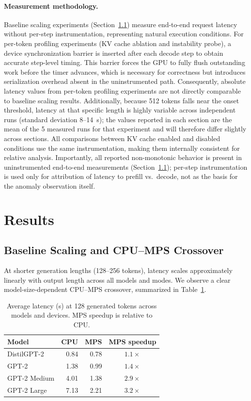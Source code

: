 \documentclass{article}
\begin{document}
\paragraph{Measurement methodology.}
Baseline scaling experiments (Section~\ref{sec:baseline}) measure end-to-end request latency without per-step instrumentation, representing natural execution conditions.
For per-token profiling experiments (KV cache ablation and instability probe), a device synchronization barrier is inserted after each decode step to obtain accurate step-level timing.
This barrier forces the GPU to fully flush outstanding work before the timer advances, which is necessary for correctness but introduces serialization overhead absent in the uninstrumented path.
Consequently, absolute latency values from per-token profiling experiments are not directly comparable to baseline scaling results.
Additionally, because 512 tokens falls near the onset threshold, latency at that specific length is highly variable across independent runs (standard deviation 8--14~s); the values reported in each section are the mean of the 5 measured runs for that experiment and will therefore differ slightly across sections.
All comparisons between KV cache enabled and disabled conditions use the same instrumentation, making them internally consistent for relative analysis.
Importantly, all reported non-monotonic behavior is present in uninstrumented end-to-end measurements (Section~\ref{sec:baseline}); per-step instrumentation is used only for attribution of latency to prefill vs.~decode, not as the basis for the anomaly observation itself.

\section{Results}

\subsection{Baseline Scaling and CPU--MPS Crossover}
\label{sec:baseline}

At shorter generation lengths (128--256 tokens), latency scales approximately linearly with output length across all models and modes. We observe a clear model-size-dependent CPU--MPS crossover, summarized in Table~\ref{tab:baseline_128}.

\begin{table}[h]
\centering
\caption{Average latency (s) at 128 generated tokens across models and devices. MPS speedup is relative to CPU.}
\label{tab:baseline_128}
\begin{tabular}{lrrc}
\toprule
Model & CPU & MPS & MPS speedup \\
\midrule
DistilGPT-2  & 0.84 & 0.78 & $1.1\times$ \\
GPT-2        & 1.38 & 0.99 & $1.4\times$ \\
GPT-2 Medium & 4.01 & 1.38 & $2.9\times$ \\
GPT-2 Large  & 7.13 & 2.21 & $3.2\times$ \\
\bottomrule
\end{tabular}
\end{table}
\end{document}
